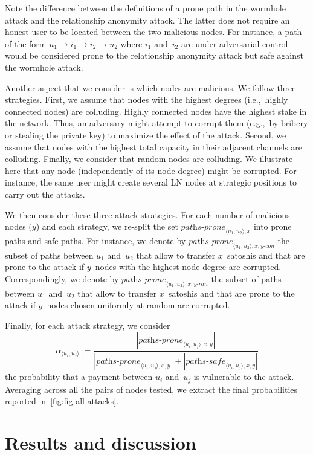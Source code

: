 Note the difference between the definitions of a prone path in the wormhole attack and the relationship anonymity attack.
The latter does not require an honest user to be located between the two malicious nodes.
For instance, a path of the form $u_1 \rightarrow i_1 \rightarrow i_2 \rightarrow u_2$ where $i_1$ and~$i_2$ are under adversarial control would be considered prone to the relationship anonymity attack but safe against the wormhole attack.

Another aspect that we consider is which nodes are malicious.
We follow three strategies.
First, we assume that nodes with the highest degrees (i.e.,~highly connected nodes) are colluding.
Highly connected nodes have the highest stake in the network.
Thus, an adversary might attempt to corrupt them (e.g.,~by bribery or stealing the private key) to maximize the effect of the attack.
Second, we assume that nodes with the highest total capacity in their adjacent channels are colluding.
Finally, we consider that random nodes are colluding.
We illustrate here that any node (independently of its node degree) might be corrupted.
For instance, the same user might create several LN nodes at strategic positions to carry out the attacks.

We then consider these three attack strategies.
For each number of malicious nodes ($y$) and each strategy, we re-split the set $\textit{paths-prone}_{\langle u_1, u_2 \rangle, x}$ into prone paths and safe paths.
For instance, we denote by $\textit{paths-prone}_{\langle u_1, u_2 \rangle, x, y\textit{-con}}$ the subset of paths between $u_1$ and~$u_2$ that allow to transfer $x$~satoshis and that are prone to the attack if $y$~nodes with the highest node degree are corrupted.
Correspondingly, we denote by $\textit{paths-prone}_{\langle u_1, u_2 \rangle, x, y\textit{-ran}}$ the subset of paths between $u_1$ and~$u_2$ that allow to transfer $x$~satoshis and that are prone to the attack if $y$~nodes chosen uniformly at random are corrupted.

Finally, for each attack strategy, we consider $$\alpha_{\langle u_i, u_j \rangle} := \frac{|\textit{paths-prone}_{\langle u_i, u_j \rangle, x, y}|}{|\textit{paths-prone}_{\langle u_i, u_j \rangle, x, y}| + |\textit{paths-safe}_{\langle u_i, u_j \rangle, x, y}|}$$ the probability that a payment between $u_i$ and~$u_j$ is vulnerable to the attack.
Averaging across all the pairs of nodes tested, we extract the final probabilities reported in~\cref{fig:fig-all-attacks}.

\section{Results and discussion}

